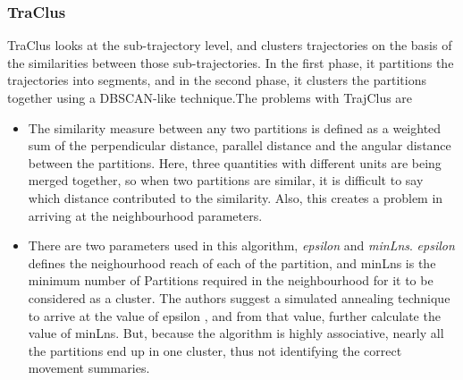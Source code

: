 \subsubsection{TraClus}
TraClus looks at the sub-trajectory level, and clusters trajectories on the basis of the similarities between those sub-trajectories. In the first phase, it partitions the trajectories into segments, and in the second phase, it clusters the partitions together using a DBSCAN-like technique.The problems with TrajClus are
\begin{itemize}

\item
The similarity measure between any two partitions is defined as a weighted sum of the perpendicular distance, parallel distance and the angular distance between the partitions. Here, three quantities with different units are being merged together, so when two partitions are similar, it is difficult to say which distance contributed to the similarity. Also, this creates a problem in arriving at the neighbourhood parameters. 

\item
 There are two parameters used in this algorithm, \textit{epsilon} and \textit{minLns}. \textit{epsilon} defines the neighourhood reach of each of the partition, and minLns is the minimum number of Partitions required in the neighbourhood for it to be considered as a cluster. The authors suggest a simulated annealing technique to arrive at the value of epsilon , and from that value, further calculate the value of minLns. But, because the algorithm is highly associative, nearly all the partitions end up in one cluster, thus not identifying the correct movement summaries. 
   

\end{itemize}
